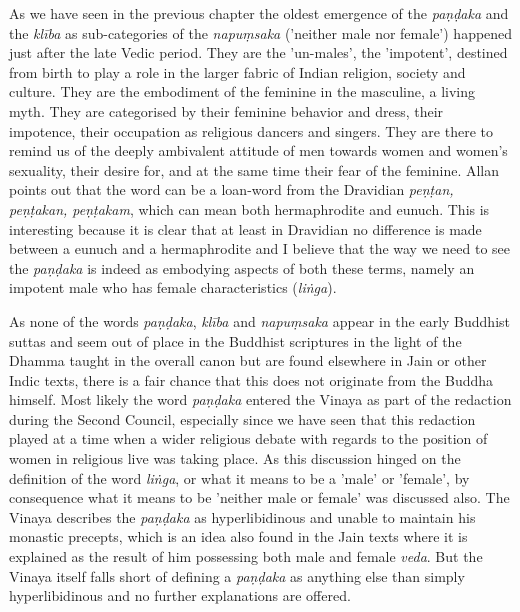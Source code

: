 As we have seen in the previous chapter the oldest emergence of the {\em paṇḍaka} and the {\em klība} as sub-categories of the {\em napuṃsaka} ('neither male nor female') happened just after the late Vedic period. They are the 'un-males', the 'impotent', destined from birth to play a role in the larger fabric of Indian religion, society and culture. They are the embodiment of the feminine in the masculine, a living myth. They are categorised by their feminine behavior and dress, their impotence, their occupation as religious dancers and singers. They are there to remind us of the deeply ambivalent attitude of men towards women and women's sexuality, their desire for, and at the same time their fear of the feminine. Allan \cite{bomhard} points out that the word can be a loan-word from the Dravidian {\em peṇṭan, peṇṭakan, peṇṭakam}, which can mean both hermaphrodite and eunuch. This is interesting because it is clear that at least in Dravidian no difference is made between a eunuch and a hermaphrodite and I believe that the way we need to see the {\em paṇḍaka} is indeed as embodying aspects of both these terms, namely an impotent male who has female characteristics ({\em liṅga}).

As none of the words {\em paṇḍaka}, {\em klība} and {\em napuṃsaka} appear in the early Buddhist suttas and seem out of place in the Buddhist scriptures in the light of the Dhamma taught in the overall canon but are found elsewhere in Jain or other Indic texts, there is a fair chance that this does not originate from the Buddha himself. Most likely the word {\em paṇḍaka} entered the Vinaya as part of the redaction during the Second Council, especially since we have seen that this redaction played at a time when a wider religious debate with regards to the position of women in religious live was taking place. As this discussion hinged on the definition of the word {\em liṅga}, or what it means to be a 'male' or 'female', by consequence what it means to be 'neither male or female' was discussed also. The Vinaya describes the {\em paṇḍaka} as hyperlibidinous and unable to maintain his monastic precepts, which is an idea also found in the Jain texts where it is explained as the result of him possessing both male and female {\em veda}. But the Vinaya itself falls short of defining a {\em paṇḍaka} as anything else than simply hyperlibidinous and no further explanations are offered. 

